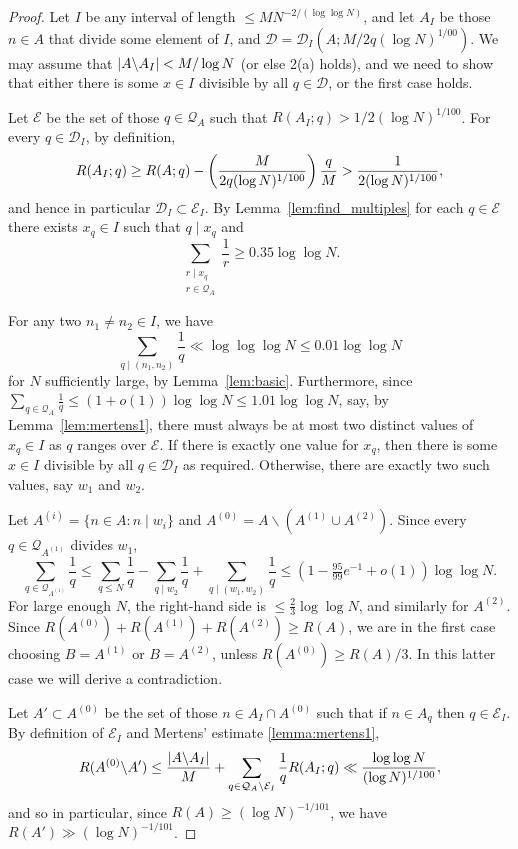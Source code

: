\begin{proof}
Let $I$ be any interval of length $\leq MN^{-2/(\log\log N)}$, and let $A_I$ be those $n\in A$ that divide some element of $I$, and $\mathcal{D}=\mathcal{D}_I(A;M/2q(\log N)^{1/00})$. We may assume that $\left\lvert A\backslash A_I\right\rvert< M/\log N$ (or else 2(a) holds), and we need to show that either there is some $x\in I$ divisible by all $q\in\mathcal{D}$, or the first case holds.

Let $\mathcal{E}$ be the set of those $q\in\mathcal{Q}_A$ such that $R(A_I;q)> 1/2(\log N)^{1/100}$. For every $q\in \mathcal{D}_I$, by definition,
  \[R(A_I; q) \geq R(A;q) - \left( \frac{M}{2q(\log N)^{1/100}}\right)\frac{q}{M}>\frac{1}{2(\log N)^{1/100}},\]
  and hence in particular $\mathcal{D}_I\subset \mathcal{E}_I$. By Lemma~\ref{lem:find_multiples} for each $q\in\mathcal{E}$ there exists $x_q\in I$ such that $q\mid x_q$ and 
\[\sum_{\substack{r\mid x_q\\ r\in \mathcal{Q}_A}}\frac{1}{r}\geq 0.35\log\log N.\] 

 For any two $n_1\neq n_2\in I$, we have
  \[\sum_{q\mid (n_1,n_2)}\frac{1}{q}\ll \log\log\log N\leq 0.01\log\log N\]
  for $N$ sufficiently large, by Lemma~\ref{lem:basic}.  Furthermore, since $\sum_{q\in\mathcal{Q}_A}\frac{1}{q}\leq (1+o(1))\log\log N\leq 1.01\log\log N$, say, by Lemma~\ref{lem:mertens1}, there must always be at most two distinct values of $x_q\in I$ as $q$ ranges over $\mathcal{E}$. If there is exactly one value for $x_q$, then there is some $x\in I$ divisible by all $q\in\mathcal{D}_I$ as required. Otherwise, there are exactly two such values, say $w_1$ and $w_2$.

  Let $A^{(i)}=\{n\in A: n\mid w_i\}$ and $A^{(0)}=A\backslash (A^{(1)}\cup A^{(2)})$. Since every $q\in\mathcal{Q}_{A^{(1)}}$ divides $w_1$,
  \[\sum_{q\in \mathcal{Q}_{A^{(1)}}}\frac{1}{q}\leq \sum_{q\leq N}\frac{1}{q}- \sum_{q\mid w_2}\frac{1}{q}+ \sum_{q\mid (w_1,w_2)}\frac{1}{q}\leq (1-\tfrac{95}{99}e^{-1}+o(1))\log\log N.\]
  For large enough $N$, the right-hand side is $\leq \frac{2}{3}\log\log N$, and similarly for $A^{(2)}$. Since $R(A^{(0)})+R(A^{(1)})+R(A^{(2)})\geq R(A)$, we are in the first case choosing $B=A^{(1)}$ or $B=A^{(2)}$, unless $R(A^{(0)})\geq R(A)/3$. In this latter case we will derive a contradiction.

  Let $A'\subset A^{(0)}$ be the set of those $n\in A_I\cap A^{(0)}$ such that if $n\in A_q$ then $q\in\mathcal{E}_I$. By definition of $\mathcal{E}_I$ and Mertens' estimate \ref{lemma:mertens1},
  \[R(A^{(0)}\backslash A')\leq \frac{\left\lvert A\backslash A_I\right\rvert}{M}+\sum_{q\in\mathcal{Q}_A\backslash \mathcal{E}_I}\frac{1}{q}R(A_I;q)\ll \frac{\log\log N}{(\log N)^{1/100}},\]
  and so  in particular, since $R(A)\geq (\log N)^{-1/101}$, we have $R(A')\gg (\log N)^{-1/101}$.


\end{proof}
